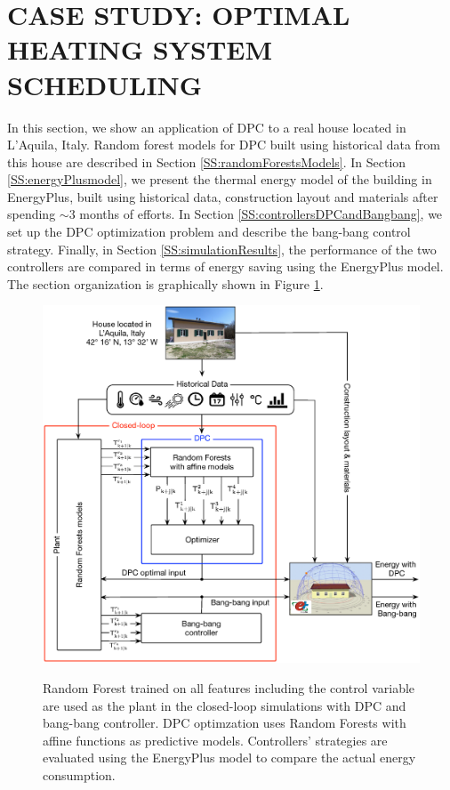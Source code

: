 \section{CASE STUDY: OPTIMAL HEATING SYSTEM SCHEDULING}
\label{S:realCaseStudy}

In this section, we show an application of DPC to a real house located in L'Aquila, Italy. Random forest models for DPC built using historical data from this house are described in Section \ref{SS:randomForestsModels}. 
In Section \ref{SS:energyPlusmodel}, we present the thermal energy model of the building in EnergyPlus, built using historical data, construction layout and materials after spending $\sim3$ months of efforts.
In Section \ref{SS:controllersDPCandBangbang}, we set up the DPC optimization problem and describe the bang-bang control strategy. Finally, in Section \ref{SS:simulationResults}, the performance of the two controllers are compared in terms of energy saving using the EnergyPlus model. The section organization is graphically shown in Figure \ref{F:overview}.

\begin{figure}[h!]
	\begin{center}
		\includegraphics[width=1\linewidth]{figures/overview.eps}
		\caption{Random Forest trained on all features including the control variable are used as the plant in the closed-loop simulations with DPC and bang-bang controller. DPC optimzation uses Random Forests with affine functions as predictive models. Controllers' strategies are evaluated using the EnergyPlus model to compare the actual energy consumption.}
		\captionsetup{justification=centering}
		\label{F:overview}
	\end{center}
\end{figure}

